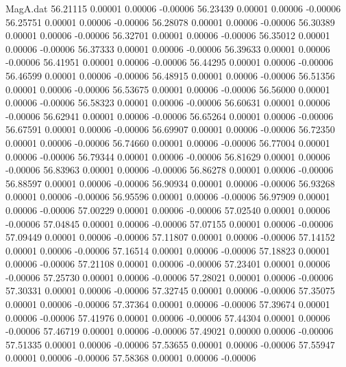 \begin{filecontents}{MagA.dat}
  56.21115    0.00001    0.00006   -0.00006
  56.23439    0.00001    0.00006   -0.00006
  56.25751    0.00001    0.00006   -0.00006
  56.28078    0.00001    0.00006   -0.00006
  56.30389    0.00001    0.00006   -0.00006
  56.32701    0.00001    0.00006   -0.00006
  56.35012    0.00001    0.00006   -0.00006
  56.37333    0.00001    0.00006   -0.00006
  56.39633    0.00001    0.00006   -0.00006
  56.41951    0.00001    0.00006   -0.00006
  56.44295    0.00001    0.00006   -0.00006
  56.46599    0.00001    0.00006   -0.00006
  56.48915    0.00001    0.00006   -0.00006
  56.51356    0.00001    0.00006   -0.00006
  56.53675    0.00001    0.00006   -0.00006
  56.56000    0.00001    0.00006   -0.00006
  56.58323    0.00001    0.00006   -0.00006
  56.60631    0.00001    0.00006   -0.00006
  56.62941    0.00001    0.00006   -0.00006
  56.65264    0.00001    0.00006   -0.00006
  56.67591    0.00001    0.00006   -0.00006
  56.69907    0.00001    0.00006   -0.00006
  56.72350    0.00001    0.00006   -0.00006
  56.74660    0.00001    0.00006   -0.00006
  56.77004    0.00001    0.00006   -0.00006
  56.79344    0.00001    0.00006   -0.00006
  56.81629    0.00001    0.00006   -0.00006
  56.83963    0.00001    0.00006   -0.00006
  56.86278    0.00001    0.00006   -0.00006
  56.88597    0.00001    0.00006   -0.00006
  56.90934    0.00001    0.00006   -0.00006
  56.93268    0.00001    0.00006   -0.00006
  56.95596    0.00001    0.00006   -0.00006
  56.97909    0.00001    0.00006   -0.00006
  57.00229    0.00001    0.00006   -0.00006
  57.02540    0.00001    0.00006   -0.00006
  57.04845    0.00001    0.00006   -0.00006
  57.07155    0.00001    0.00006   -0.00006
  57.09449    0.00001    0.00006   -0.00006
  57.11807    0.00001    0.00006   -0.00006
  57.14152    0.00001    0.00006   -0.00006
  57.16514    0.00001    0.00006   -0.00006
  57.18823    0.00001    0.00006   -0.00006
  57.21108    0.00001    0.00006   -0.00006
  57.23401    0.00001    0.00006   -0.00006
  57.25730    0.00001    0.00006   -0.00006
  57.28021    0.00001    0.00006   -0.00006
  57.30331    0.00001    0.00006   -0.00006
  57.32745    0.00001    0.00006   -0.00006
  57.35075    0.00001    0.00006   -0.00006
  57.37364    0.00001    0.00006   -0.00006
  57.39674    0.00001    0.00006   -0.00006
  57.41976    0.00001    0.00006   -0.00006
  57.44304    0.00001    0.00006   -0.00006
  57.46719    0.00001    0.00006   -0.00006
  57.49021    0.00000    0.00006   -0.00006
  57.51335    0.00001    0.00006   -0.00006
  57.53655    0.00001    0.00006   -0.00006
  57.55947    0.00001    0.00006   -0.00006
  57.58368    0.00001    0.00006   -0.00006

\end{filecontents}
